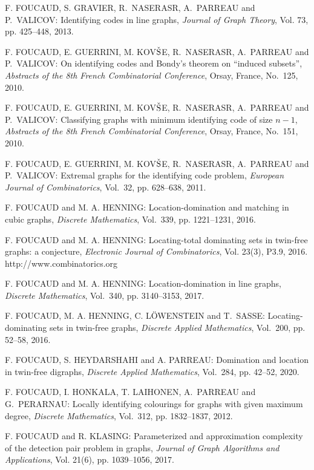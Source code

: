 \begin{thebibliography}{999}
F. FOUCAUD, S. GRAVIER, R.~NASERASR, A.~PARREAU and P.~VALICOV: Identifying codes in line graphs, {\it Journal of Graph Theory}, Vol. 73, pp. 425--448, 2013.

F. FOUCAUD, E. GUERRINI, M. KOV$\check{\rm S}$E, R.~NASERASR, A.~PARREAU and P.~VALICOV: On identifying codes and Bondy's theorem on ``induced subsets'', {\it Abstracts of the 8th French Combinatorial Conference}, Orsay, France, No.~125, 2010.

F. FOUCAUD, E. GUERRINI, M. KOV$\check{\rm S}$E, R.~NASERASR, A.~PARREAU and P.~VALICOV: Classifying graphs with minimum identifying code of size $n-1$, {\it Abstracts of the 8th French Combinatorial Conference}, Orsay, France, No.~151, 2010.

F. FOUCAUD, E. GUERRINI, M. KOV$\check{\rm S}$E, R.~NASERASR, A.~PARREAU and P.~VALICOV: Extremal graphs for the identifying code problem, {\it European Journal of Combinatorics}, Vol.~32, pp. 628--638, 2011.

F. FOUCAUD and M. A. HENNING: Location-domination and matching in cubic graphs, {\it Discrete Mathematics}, Vol.~339, pp. 1221--1231, 2016.

F. FOUCAUD and M. A. HENNING: Locating-total dominating sets in twin-free graphs: a conjecture, {\it Electronic Journal of Combinatorics}, Vol. 23(3), P3.9, 2016.\\
http://www.combinatorics.org

F. FOUCAUD and M. A. HENNING: Location-domination in line graphs, {\it Discrete Mathematics}, Vol.~340, pp. 3140--3153, 2017.
 
 F. FOUCAUD, M. A. HENNING, C. L\"{O}WENSTEIN and T.~SASSE: Locating-dominating sets in twin-free graphs, {\it Discrete Applied Mathematics}, Vol.~200, pp. 52--58, 2016.

F. FOUCAUD, S. HEYDARSHAHI and A. PARREAU: Domination and location in twin-free digraphs, {\it Discrete Applied Mathematics}, Vol.~284, pp. 42--52, 2020.

F. FOUCAUD, I. HONKALA, T. LAIHONEN, A.~PARREAU and G.~PERARNAU: Locally identifying colourings for graphs with given maximum degree, {\it Discrete Mathematics}, Vol.~312, pp. 1832--1837, 2012.

F. FOUCAUD and R. KLASING: Parameterized and approximation complexity of the detection pair problem in graphs, {\it Journal of Graph Algorithms and Applications}, Vol. 21(6), pp. 1039--1056, 2017.


\end{thebibliography}
